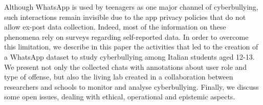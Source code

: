 Although WhatsApp is used by teenagers as one major channel of cyberbullying, such interactions remain invisible due to the app privacy policies that do not allow ex-post data  collection. Indeed, most of the information on these phenomena rely on surveys regarding self-reported data. In order to overcome this limitation, we describe in this paper the activities that led to the creation of a WhatsApp dataset to study cyberbullying among Italian students aged 12-13. We present not only the collected chats with annotations about user role and type of offense, but also the living lab created in a collaboration between researchers and schools to monitor and analyse cyberbullying. Finally, we discuss some open issues, dealing with ethical, operational and epistemic aspects.
